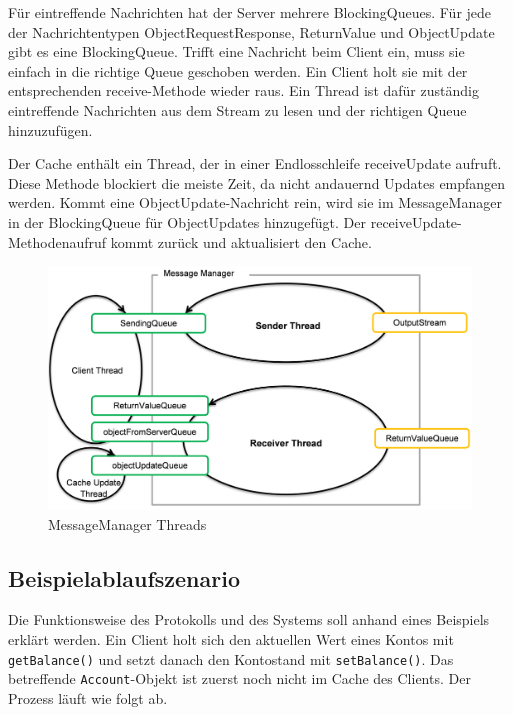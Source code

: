 Für eintreffende Nachrichten hat der Server mehrere BlockingQueues. Für jede der Nachrichtentypen ObjectRequestResponse, ReturnValue und ObjectUpdate gibt es eine BlockingQueue. Trifft eine Nachricht beim Client ein, muss sie einfach in die richtige Queue geschoben werden. Ein Client holt sie mit der entsprechenden receive-Methode wieder raus. Ein Thread ist dafür zuständig eintreffende Nachrichten aus dem Stream zu lesen und der richtigen Queue hinzuzufügen. 

Der Cache enthält ein Thread, der in einer Endlosschleife receiveUpdate aufruft. Diese Methode blockiert die meiste Zeit, da nicht andauernd Updates empfangen werden. Kommt eine ObjectUpdate-Nachricht rein, wird sie im MessageManager in der BlockingQueue für ObjectUpdates hinzugefügt. Der receiveUpdate-Methodenaufruf kommt zurück und aktualisiert den Cache.

\begin{figure}[h]
  \centering
  \includegraphics[scale=0.3]{images_objectcaching/messageManager}  
  \caption{MessageManager Threads}
  \label{fig:msgmng}
\end{figure}

\subsection{Beispielablaufszenario}
\label{sec:beisp}

Die Funktionsweise des Protokolls und des Systems soll anhand eines Beispiels erklärt werden. Ein Client holt sich den aktuellen Wert eines Kontos mit \texttt{getBalance()} und setzt danach den Kontostand mit \texttt{setBalance()}. Das betreffende \texttt{Account}-Objekt ist zuerst noch nicht im Cache des Clients. Der Prozess läuft wie folgt ab.

